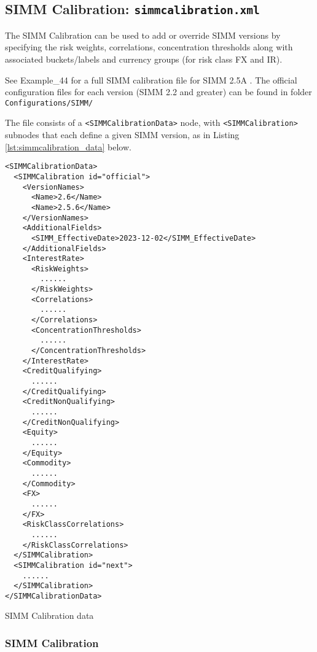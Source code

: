 \subsection{SIMM Calibration: {\tt simmcalibration.xml}}\label{sec:simmcalibration}

The SIMM Calibration can be used to add or override SIMM versions by specifying the risk weights, correlations,
concentration thresholds along with associated buckets/labels and currency groups (for risk class FX and IR).

See Example\_44 for a full SIMM calibration file for SIMM 2.5A \cite{SIMM2.5A}.
The official configuration files for each version (SIMM 2.2 and greater) can be found in folder {\tt Configurations/SIMM/}

The file consists of a {\tt <SIMMCalibrationData>} node, with {\tt <SIMMCalibration>} subnodes that each define a given
SIMM version, as in Listing \ref{lst:simmcalibration_data} below.

\begin{listing}[H]
\begin{verbatim}
<SIMMCalibrationData>
  <SIMMCalibration id="official">
    <VersionNames>
      <Name>2.6</Name>
      <Name>2.5.6</Name>
    </VersionNames>
    <AdditionalFields>
      <SIMM_EffectiveDate>2023-12-02</SIMM_EffectiveDate>
    </AdditionalFields>
    <InterestRate>
      <RiskWeights>
        ......
      </RiskWeights>
      <Correlations>
        ......
      </Correlations>
      <ConcentrationThresholds>
        ......
      </ConcentrationThresholds>
    </InterestRate>
    <CreditQualifying>
      ......
    </CreditQualifying>
    <CreditNonQualifying>
      ......
    </CreditNonQualifying>
    <Equity>
      ......
    </Equity>
    <Commodity>
      ......
    </Commodity>
    <FX>
      ......
    </FX>
    <RiskClassCorrelations>
      ......
    </RiskClassCorrelations>
  </SIMMCalibration>
  <SIMMCalibration id="next">
    ......
  </SIMMCalibration>
</SIMMCalibrationData>
\end{verbatim}
\caption{SIMM Calibration data}
\label{lst:simmcalibration_data}
\end{listing}

\subsubsection{SIMM Calibration}

